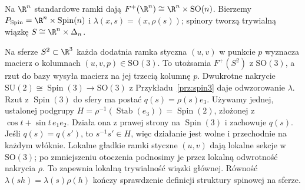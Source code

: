 \begin{przyklad}
Na $\R^n$ standardowe ramki dają
$F^+(\R^n)\cong\R^n\times\mathrm{SO}(n)$.
Bierzemy
$P_{\mathrm{Spin}}=\R^n\times\operatorname{Spin}(n)$
i $\lambda(x,s)=(x,\rho(s))$; spinory
tworzą trywialną wiązkę
$S\cong\R^n\times\Delta_n$.

Na sferze $S^2\subset\R^3$ każda dodatnia
ramka styczna $(u,v)$ w punkcie $p$ wyznacza
macierz o kolumnach $(u,v,p)\in\mathrm{SO}(3)$.
To utożsamia $F^+(S^2)$ z $\mathrm{SO}(3)$,
a rzut do bazy wysyła macierz na jej trzecią
kolumnę $p$. Dwukrotne nakrycie
$\mathrm{SU}(2)\cong\operatorname{Spin}(3)
\to\mathrm{SO}(3)$ z
Przykładu~\ref{prz:spin3} daje odwzorowanie $\lambda$.
Rzut z $\operatorname{Spin}(3)$ do sfery ma postać
$q(s)=\rho(s)e_3$. Używamy jednej, ustalonej podgrupy
$H=\rho^{-1}(\operatorname{Stab}(e_3))=\operatorname{Spin}(2)$,
złożonej z $\cos t+\sin t\,e_1e_2$. Działa ona z prawej strony
na $\operatorname{Spin}(3)$ i zachowuje $q(s)$.
Jeśli $q(s)=q(s')$, to $s^{-1}s'\in H$, więc działanie jest
wolne i przechodnie na każdym włóknie. Lokalne gładkie ramki
styczne $(u,v)$ dają lokalne sekcje w $\mathrm{SO}(3)$;
po zmniejszeniu otoczenia podnosimy je przez lokalną odwrotność
nakrycia $\rho$. To zapewnia lokalną trywialność wiązki głównej.
Równość $\lambda(sh)=\lambda(s)\rho(h)$ kończy sprawdzenie
definicji struktury spinowej na sferze.
\end{przyklad}

